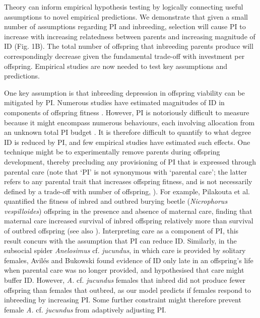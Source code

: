 \documentclass[12pt]{article}
\begin{document}
Theory can inform empirical hypothesis testing by logically connecting useful assumptions to novel empirical predictions. We demonstrate that given a small number of assumptions regarding PI and inbreeding, selection will cause PI to increase with increasing relatedness between parents and increasing magnitude of ID (Fig. 1B). The total number of offspring that inbreeding parents produce will correspondingly decrease given the fundamental trade-off with investment per offspring. Empirical studies are now needed to test key assumptions and predictions.

One key assumption is that inbreeding depression in offspring viability can be mitigated by PI. Numerous studies have estimated magnitudes of ID in components of offspring fitness \cite[][]{Keller2002, Charlesworth2009, Szulkin2012}. However, PI is notoriously difficult to measure because it might encompass numerous behaviours, each involving allocation from an unknown total PI budget \cite[][]{Parker2002}. It is therefore difficult to quantify to what degree ID is reduced by PI, and few empirical studies have estimated such effects. One technique might be to experimentally remove parents during offspring development, thereby precluding any provisioning of PI that is expressed through parental care (note that `PI' is not synonymous with `parental care'; the latter refers to any parental trait that increases offspring fitness, and is not necessarily defined by a trade-off with number of offspring, \cite[][]{Gardner2011a, Royle2012}). For example, Pilakouta et al. \cite{Pilakouta2015} quantified the fitness of inbred and outbred burying beetle (\textit{Nicrophorus vespilloides}) offspring in the presence and absence of maternal care, finding that maternal care increased survival of inbred offspring relatively more than survival of outbred offspring (see also \cite{Pilakouta2016}). Interpreting care as a component of PI, this result concurs with the assumption that PI can reduce ID. Similarly, in the subsocial spider \textit{Anelosimus} cf. \textit{jucundus}, in which care is provided by solitary females, Avil{\'{e}}s and Bukowski \cite{Aviles2006} found evidence of ID only late in an offspring's life when parental care was no longer provided, and hypothesised that care might buffer ID. However, \textit{A.} cf. \textit{jucundus} females that inbred did not produce fewer offspring than females that outbred, as our model predicts if females respond to inbreeding by increasing PI. Some further constraint might therefore prevent female \textit{A.} cf. \textit{jucundus} from adaptively adjusting PI.
\end{document}
